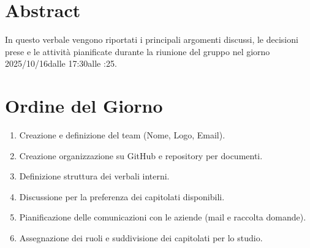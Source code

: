 \documentclass[a4paper,12pt]{article}
\newcommand{\DataVerbale}{2025/10/16}
\newcommand{\OraInizio}{17:30}
\newcommand{\OraFine}{19:25}
\newcommand{\AbstractVerbale}{%
In questo verbale vengono riportati i principali argomenti discussi, le decisioni prese e le attività pianificate durante la riunione del gruppo nel giorno \DataVerbale \space dalle \OraInizio \space alle \space \OraFine .
}
\begin{document}
\newpage

\tableofcontents

\newpage
\section{Abstract}{
    \begin{minipage}{0.9\textwidth}
        \small
        \AbstractVerbale
    \end{minipage}
}


\section{Ordine del Giorno}{
    \begin{enumerate}
        \item Creazione e definizione del team (Nome, Logo, Email).
        \item Creazione organizzazione su GitHub e repository per documenti.
        \item Definizione struttura dei verbali interni.
        \item Discussione per la preferenza dei capitolati disponibili.
        \item Pianificazione delle comunicazioni con le aziende (mail e raccolta domande).
        \item Assegnazione dei ruoli e suddivisione dei capitolati per lo studio.
    \end{enumerate}
}
\end{document}
